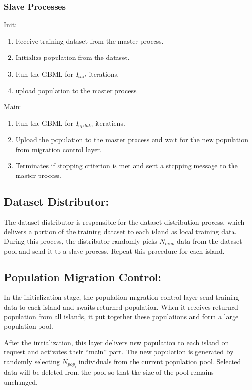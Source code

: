 \documentclass[conference]{IEEEtran}
\begin{document}
  \subsubsection{Slave Processes}\mbox{}
  
  Init:
  \begin{enumerate}[leftmargin =4\parindent]
  \item Receive training dataset from the master process.
  \item Initialize population from the dataset.
  \item Run the GBML for $I_{init}$ iterations.
  \item upload population to the master process.
  \end{enumerate}

  Main:
  \begin{enumerate}[leftmargin=4\parindent]
  \item Run the GBML for $I_{update}$ iterations.
  \item Upload the population to the master process and wait for the new population from migration control layer.
  \item Terminates if stopping criterion is met and sent a stopping message to the master process.
  \end{enumerate}

	\subsection{Dataset Distributor:}
	The dataset distributor is responsible for the dataset distribution process, which delivers a portion of the training dataset to each island as local training data. During this process, the distributor randomly picks $N_{land}$ data from the dataset pool and send it to a slave process. Repeat this procedure for each island.
  \subsection{Population Migration Control:}
  In the initialization stage, the population migration control layer send training data to each island and awaits returned population. When it receives returned population from all islands, it put together these populations and form a large population pool. 
	
	After the initialization, this layer delivers new population to each island on request and activates their “main” part. The new population is generated by randomly selecting $ N_{pop_{i}}$ individuals from the current population pool. Selected data will be deleted from the pool so that the size of the pool remains unchanged.
	
\end{document}
